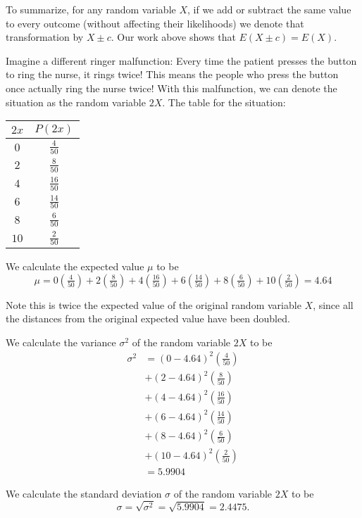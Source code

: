 To summarize, for any random variable \(X\), if we add or subtract the same value  to every outcome (without affecting their likelihoods) we denote that transformation by \( X \pm c \). Our work above shows that \( E(X \pm c) = E(X) \).

\begin{example}
Imagine a different ringer malfunction: Every time the patient presses the button to ring the nurse, it rings twice! This means the people who press the button once actually ring the nurse twice! With this malfunction, we can denote the situation as the random variable \(2X\). The table for the situation:
\begin{center}
\begin{tabular}{c|c}
\(2x\)	&	\(P(2x)\)	\\ \hline \hline
\(0\)	&	\(\tfrac{4}{50}\)	\\ \hline 
\(2\)	&	\(\tfrac{8}{50}\)	\\ \hline
\(4\)	&	\(\tfrac{16}{50}\)	\\ \hline
\(6\)	&	\(\tfrac{14}{50}\)	\\ \hline
\(8\)	&	\(\tfrac{6}{50}\)	\\ \hline
\(10\)	&	\(\tfrac{2}{50}\)	\\ \hline
\end{tabular}
\end{center}
We calculate the expected value \(\mu\) to be 
\[\mu=0(\tfrac{4}{50})+2(\tfrac{8}{50})+4(\tfrac{16}{50})+6(\tfrac{14}{50})+8(\tfrac{6}{50})+10(\tfrac{2}{50})=4.64\]

Note this is twice the expected value of the original random variable \(X\), since all the distances from the original expected value have been doubled.

We calculate the variance \(\sigma^2\) of the random variable \(2X\) to be
\begin{align*}
\sigma^2
&=(0-4.64)^2(\tfrac{4}{50}) \\
&+(2-4.64)^2(\tfrac{8}{50}) \\
&+(4-4.64)^2(\tfrac{16}{50}) \\
&+(6-4.64)^2(\tfrac{14}{50}) \\
&+(8-4.64)^2(\tfrac{6}{50}) \\
&+(10-4.64)^2(\tfrac{2}{50}) \\
&=5.9904
\end{align*}

We calculate the standard deviation \(\sigma\) of the random variable \(2X\) to be
\[
\sigma = \sqrt{ \sigma^2 } = \sqrt{5.9904} = 2.4475.
\]
\end{example}


